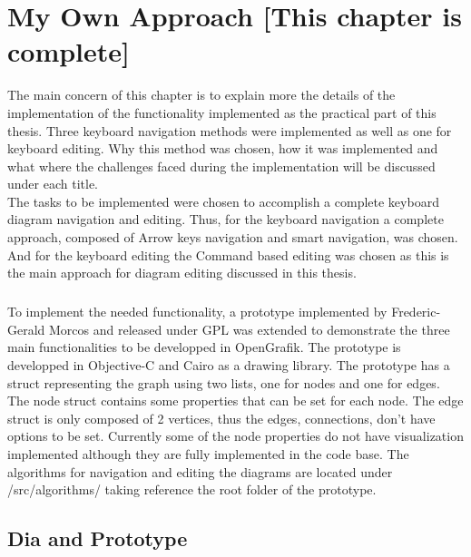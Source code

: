 \chapter{My Own Approach [This chapter is complete]}
\beginchapter
The main concern of this chapter is to explain more the details of the implementation of the functionality implemented as the practical part of this thesis. Three keyboard navigation methods were implemented as well as one for keyboard editing. Why this method was chosen, how it was implemented and what where the challenges faced during the implementation will be discussed under each title.\\
The tasks to be implemented were chosen to accomplish a complete keyboard diagram navigation and editing. Thus, for the keyboard navigation a complete approach, composed of Arrow keys navigation and smart navigation, was chosen. And for the keyboard editing the Command based editing was chosen as this is the main approach for diagram editing discussed in this thesis.

\paragraph{}
To implement the needed functionality, a prototype implemented by Frederic-Gerald Morcos and released under GPL was extended to demonstrate the three main functionalities to be developped in OpenGrafik. The prototype is developped in Objective-C and Cairo as a drawing library. The prototype has a struct representing the graph using two lists, one for nodes and one for edges. The node struct contains some properties that can be set for each node. The edge struct is only composed of 2 vertices, thus the edges, connections, don't have options to be set. Currently some of the node properties do not have visualization implemented although they are fully implemented in the code base. The algorithms for navigation and editing the diagrams are located under /src/algorithms/ taking reference the root folder of the prototype.

\section{Dia and Prototype}
